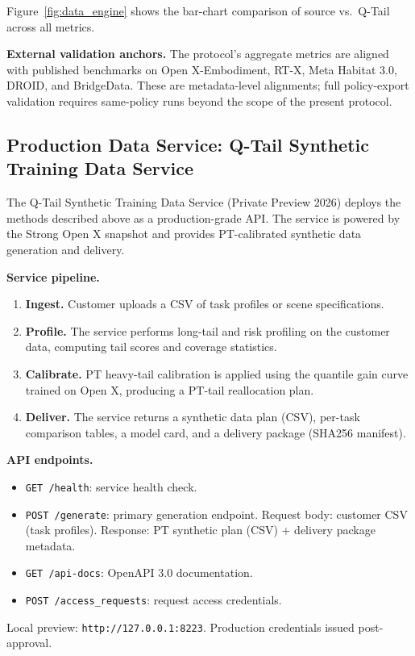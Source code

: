 \documentclass[10pt]{article}
\begin{document}
Figure~\ref{fig:data_engine} shows the bar-chart comparison of source vs.\ Q-Tail
across all metrics.

\medskip\noindent\textbf{External validation anchors.}  The protocol's aggregate
metrics are aligned with published benchmarks on Open X-Embodiment, RT-X, Meta Habitat
3.0, DROID, and BridgeData.  These are metadata-level alignments; full policy-export
validation requires same-policy runs beyond the scope of the present protocol.

\subsection{Production Data Service: Q-Tail Synthetic Training Data Service}
\label{sec:service}

The Q-Tail Synthetic Training Data Service (Private Preview 2026) deploys the methods
described above as a production-grade API.  The service is powered by the Strong Open X
snapshot and provides PT-calibrated synthetic data generation and delivery.

\medskip\noindent\textbf{Service pipeline.}
\begin{enumerate}
  \item \textbf{Ingest.} Customer uploads a CSV of task profiles or scene specifications.
  \item \textbf{Profile.} The service performs long-tail and risk profiling on the
    customer data, computing tail scores and coverage statistics.
  \item \textbf{Calibrate.} PT heavy-tail calibration is applied using the quantile gain
    curve trained on Open X, producing a PT-tail reallocation plan.
  \item \textbf{Deliver.} The service returns a synthetic data plan (CSV), per-task
    comparison tables, a model card, and a delivery package (SHA256 manifest).
\end{enumerate}

\medskip\noindent\textbf{API endpoints.}
\begin{itemize}
  \item \texttt{GET /health}: service health check.
  \item \texttt{POST /generate}: primary generation endpoint.  Request body: customer CSV
    (task profiles).  Response: PT synthetic plan (CSV) + delivery package metadata.
  \item \texttt{GET /api-docs}: OpenAPI 3.0 documentation.
  \item \texttt{POST /access\_requests}: request access credentials.
\end{itemize}
Local preview: \texttt{http://127.0.0.1:8223}.  Production credentials issued post-approval.
\end{document}
